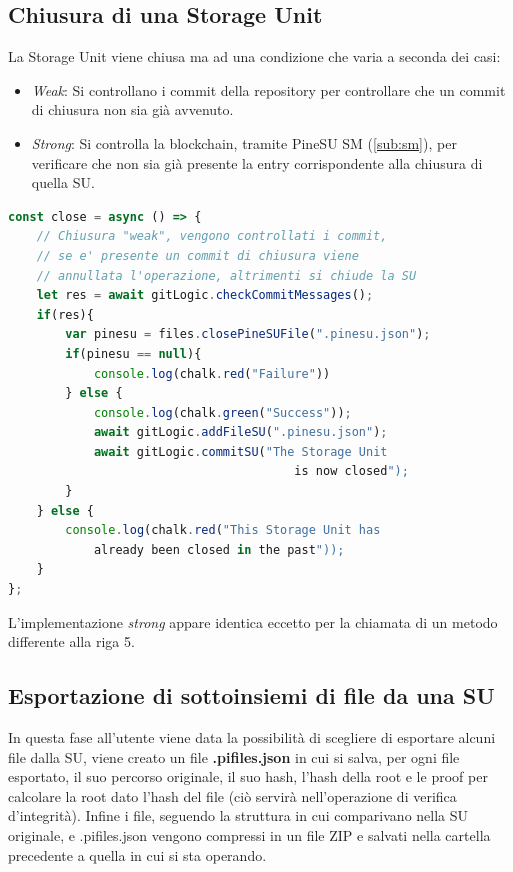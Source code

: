 \subsection{Chiusura di una Storage Unit}
La Storage Unit viene chiusa ma ad una condizione che varia a seconda dei casi:
\begin{itemize}
    \item \emph{Weak}: Si controllano i commit della repository per controllare che un commit di chiusura non sia già avvenuto.
    \item \emph{Strong}: Si controlla la blockchain, tramite PineSU SM (\autoref{sub:sm}), per verificare che non sia già presente la entry corrispondente alla chiusura di quella SU.
\end{itemize}

\begin{lstlisting}[language=JavaScript]
const close = async () => {
    // Chiusura "weak", vengono controllati i commit,
    // se e' presente un commit di chiusura viene
    // annullata l'operazione, altrimenti si chiude la SU
    let res = await gitLogic.checkCommitMessages();
    if(res){
        var pinesu = files.closePineSUFile(".pinesu.json");
        if(pinesu == null){
            console.log(chalk.red("Failure"))
        } else {
            console.log(chalk.green("Success"));
            await gitLogic.addFileSU(".pinesu.json");
            await gitLogic.commitSU("The Storage Unit
                                        is now closed");
        }
    } else {
        console.log(chalk.red("This Storage Unit has
            already been closed in the past"));
    }
};
\end{lstlisting}

L'implementazione \emph{strong} appare identica eccetto per la chiamata di un metodo differente
alla \textsf{riga 5}. 

\subsection{Esportazione di sottoinsiemi di file da una SU}
In questa fase all'utente viene data la possibilità di scegliere di esportare alcuni file dalla SU, viene creato un file \textbf{.pifiles.json} in cui si salva, per ogni file esportato, il suo percorso originale, il suo hash, l'hash della root e le proof per calcolare la root dato l'hash del file (ciò servirà nell'operazione di verifica d'integrità). Infine i file, seguendo la struttura in cui comparivano nella SU originale, e .pifiles.json vengono compressi in un file ZIP e salvati nella cartella precedente a quella in cui si sta operando.

